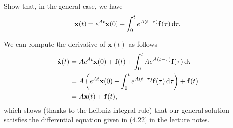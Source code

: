 Show that, in the general case, we have
\[
\mathbf{x}(t) = e^{At}\mathbf{x}(0) + \int_0^t e^{A(t - \tau)} \mathbf{f}(\tau) \operatorname{d}\! \tau.
\]
\begin{solution}
We can compute the derivative of \(\mathbf{x}(t)\) as follows
\begin{align*}
\dot{\mathbf{x}}(t) &= Ae^{At}\mathbf{x}(0) + \mathbf{f}(t) + \int_0^t A e^{A(t - \tau)} \mathbf{f}(\tau) \operatorname{d}\! \tau\\
&= A \left(e^{At}\mathbf{x}(0)  + \int_0^t e^{A(t - \tau)} \mathbf{f}(\tau) \operatorname{d}\! \tau\right) + \mathbf{f}(t)\\
&= A \mathbf{x}(t) + \mathbf{f}(t),
\end{align*}
which shows (thanks to the Leibniz integral rule) that our general solution satisfies the differential equation given in (4.22) in the lecture notes.
\end{solution}